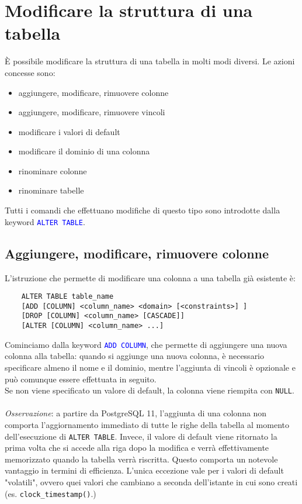 \documentclass[12pt,a4paper]{book}
\begin{document}
	\section{Modificare la struttura di una tabella}
	È possibile modificare la struttura di una tabella in molti modi diversi. Le azioni concesse sono:
	\begin{itemize}
		\item aggiungere, modificare, rimuovere colonne
		\item aggiungere, modificare, rimuovere vincoli
		\item modificare i valori di default
		\item modificare il dominio di una colonna
		\item rinominare colonne
		\item rinominare tabelle
	\end{itemize}
	Tutti i comandi che effettuano modifiche di questo tipo sono introdotte dalla keyword \textcolor{blue}{\texttt{ALTER TABLE}}.
	\subsection{Aggiungere, modificare, rimuovere colonne}
	L'istruzione che permette di modificare una colonna a una tabella già esistente è:
	\begin{lstlisting}
	ALTER TABLE table_name
	[ADD [COLUMN] <column_name> <domain> [<constraints>] ]
	[DROP [COLUMN] <column_name> [CASCADE]]
	[ALTER [COLUMN] <column_name> ...]
	\end{lstlisting}
	Cominciamo dalla keyword \textcolor{blue}{\texttt{ADD COLUMN}}, che permette di aggiungere una nuova colonna alla tabella: quando si aggiunge una nuova colonna, è necessario specificare almeno il nome e il dominio, mentre l'aggiunta di vincoli è opzionale e può comunque essere effettuata in seguito.\\
	Se non viene specificato un valore di default, la colonna viene riempita con \texttt{NULL}.
	\paragraph{}\textit{Osservazione}: a partire da PostgreSQL 11, l'aggiunta di una colonna non comporta l'aggiornamento immediato di tutte le righe della tabella al momento dell'esecuzione di \texttt{ALTER TABLE}. Invece, il valore di default viene ritornato la prima volta che si accede alla riga dopo la modifica e verrà effettivamente memorizzato quando la tabella verrà riscritta. Questo comporta un notevole vantaggio in termini di efficienza. L'unica eccezione vale per i valori di default "volatili", ovvero quei valori che cambiano a seconda dell'istante in cui sono creati (es. \texttt{clock_timestamp()}.)
\end{document}
